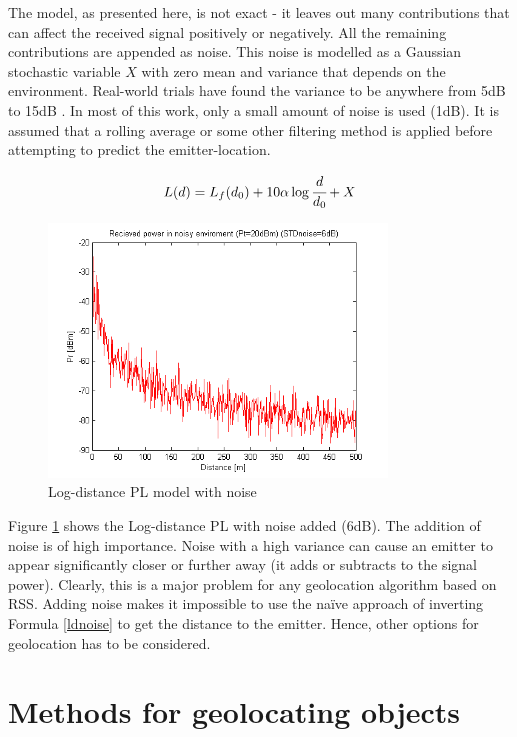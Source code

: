 \documentclass[10pt,a4paper]{book}
\begin{document}
The model, as presented here, is not exact - it leaves out many contributions that can affect the received signal positively or negatively. All the remaining contributions are appended as noise. This noise is modelled as a Gaussian stochastic variable $X$ with zero mean and variance that depends on the environment. Real-world trials have found the variance to be anywhere from 5dB to 15dB \cite{saunders2007antennas}. In most of this work, only a small amount of noise is used (1dB). It is assumed that a rolling average or some other filtering method is applied before attempting to predict the emitter-location.


\begin{eqnarray}
 L(d) = L_f(d_0) + 10 \alpha \log \cfrac{d}{d_0} + X\label{ldnoise}
\end{eqnarray}


\begin{figure}[H]
\centering
\includegraphics[width=90mm]{Pathlosswithnoise.png}
\caption{Log-distance \acrfull{PL} model with noise}
\label{pathlossnoisy}
\end{figure}

Figure \ref{pathlossnoisy} shows the Log-distance \gls{PL} with noise added (6dB). The addition of noise is of high importance. Noise with a high variance can cause an emitter to appear significantly closer or further away (it adds or subtracts to the signal power). Clearly, this is a major problem for any geolocation algorithm based on \gls{RSS}.  Adding noise makes it impossible to use the naïve approach of inverting Formula \ref{ldnoise} to get the distance to the emitter. Hence, other options for geolocation has to be considered.

\newpage
\section{Methods for geolocating objects }
\label{MFLO23S}
\end{document}
